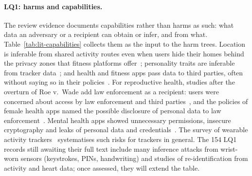 \paragraph{LQ1: harms and capabilities.} The review evidence documents
capabilities rather than harms as such: what data an adversary or a recipient
can obtain or infer, and from what. Table~\ref{tab:lit-capabilities} collects
them as the input to the harm trees. Location is inferable from shared activity
routes even when users hide their homes behind the privacy zones that fitness
platforms offer~\parencite{hassan2018analysis,dhondt2022run}; personality traits
are inferable from tracker data~\parencite{zufferey2023watch}; and health and
fitness apps pass data to third parties, often without saying so in their
policies~\parencite{huckvale2015unaddressed,huckvale2019assessment,grundy2019data,tangari2021mobile}.
For reproductive health, studies after the overturn of Roe v.~Wade add law
enforcement as a recipient: users were concerned about access by law
enforcement and third parties~\parencite{cao2024deleted}, and the policies of
female health apps named the possible disclosure of personal data to law
enforcement~\parencite{malki2024exploring}. Mental health apps showed
unnecessary permissions, insecure cryptography and leaks of personal data and
credentials~\parencite{iwaya2023privacy}. The survey of wearable activity
trackers~\parencite{niksirat2024wearable} systematises such risks for
trackers in general. The 154 LQ1 records still awaiting their full text
include many inference attacks from wrist-worn sensors (keystrokes, PINs,
handwriting) and studies of re-identification from activity and heart data;
once assessed, they will extend the table.

